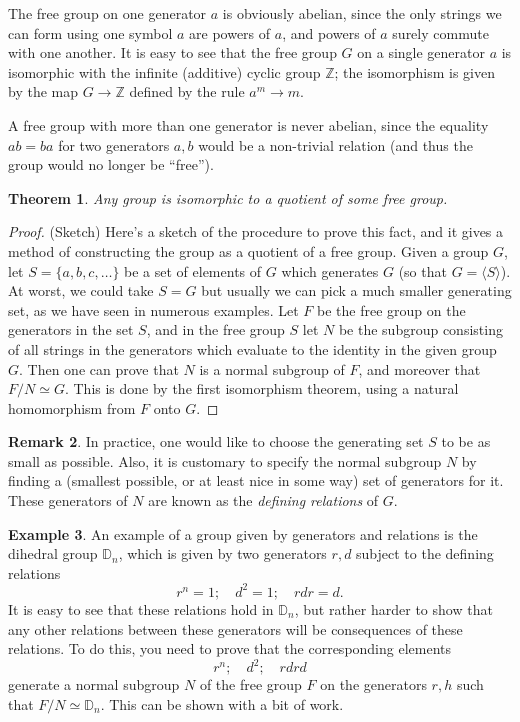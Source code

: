 \documentclass[11pt,oneside]{article}
\newtheorem{thm}{Theorem}[section]
\theoremstyle{definition}
\newtheorem{example}[thm]{Example}
\newtheorem{rmk}[thm]{Remark}
\newcommand{\Z}{\mathbb{Z}} %
\newcommand{\gen}[1]{\langle #1 \rangle}
\newcommand{\D}{\mathbb{D}}
\begin{document}
The free group on one generator $a$ is obviously abelian, since the
only strings we can form using one symbol $a$ are powers of $a$, and
powers of $a$ surely commute with one another. It is easy to see that
the free group $G$ on a single generator $a$ is isomorphic with the
infinite (additive) cyclic group $\Z$; the isomorphism is given by the
map $G \to \Z$ defined by the rule $a^m \to m$.

A free group with more than one generator is never abelian, since the
equality $ab=ba$ for two generators $a,b$ would be a non-trivial
relation (and thus the group would no longer be ``free'').


\begin{thm}
  Any group is isomorphic to a quotient of some free group.
\end{thm}


\begin{proof} (Sketch)
Here's a sketch of the procedure to prove this fact, and it gives a
method of constructing the group as a quotient of a free group. Given
a group $G$, let $S=\{a,b,c, \dots \}$ be a set of elements of $G$
which generates $G$ (so that $G=\gen{S}$). At worst, we could take $S
= G$ but usually we can pick a much smaller generating set, as we have
seen in numerous examples. Let $F$ be the free group on the generators
in the set $S$, and in the free group $S$ let $N$ be the subgroup
consisting of all strings in the generators which evaluate to the
identity in the given group $G$. Then one can prove that $N$ is a
normal subgroup of $F$, and moreover that $F/N \simeq G$. This is done
by the first isomorphism theorem, using a natural homomorphism from
$F$ onto $G$.
\end{proof}

\begin{rmk}
In practice, one would like to choose the generating set $S$ to be as
small as possible. Also, it is customary to specify the normal
subgroup $N$ by finding a (smallest possible, or at least nice in some
way) set of generators for it. These generators of $N$ are known as
the \emph{defining relations} of $G$. 
\end{rmk}

\begin{example}
An example of a group given by generators and relations is the
dihedral group $\D_n$, which is given by two generators $r,d$ subject
to the defining relations
\[
 r^n=1; \quad d^2 = 1; \quad rdr = d.
\]
It is easy to see that these relations hold in $\D_n$, but rather
harder to show that any other relations between these generators will
be consequences of these relations. To do this, you need to prove that
the corresponding elements
\[
  r^n; \quad d^2; \quad rdrd
\]
generate a normal subgroup $N$ of the free group $F$ on the generators
$r,h$ such that $F/N \simeq \D_n$. This can be shown with a bit of work. 
\end{example}
\end{document}
